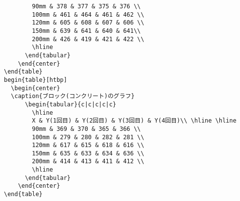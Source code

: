\documentclass{jsarticle}
\begin{document}
\begin{verbatim}
        90mm & 378 & 377 & 375 & 376 \\
        100mm & 461 & 464 & 461 & 462 \\
        120mm & 605 & 608 & 607 & 606 \\
        150mm & 639 & 641 & 640 & 641\\
        200mm & 426 & 419 & 421 & 422 \\
        \hline
      \end{tabular}
    \end{center}
\end{table}
begin{table}[htbp]
  \begin{center}
  \caption{ブロック(コンクリート)のグラフ}
      \begin{tabular}{c|c|c|c|c}
        \hline
        X & Y(1回目) & Y(2回目) & Y(3回目) & Y(4回目)\\ \hline \hline
        90mm & 369 & 370 & 365 & 366 \\
        100mm & 279 & 280 & 282 & 281 \\
        120mm & 617 & 615 & 618 & 616 \\
        150mm & 635 & 633 & 634 & 636 \\
        200mm & 414 & 413 & 411 & 412 \\
        \hline
      \end{tabular}
    \end{center}
\end{table}


\end{verbatim}
\end{document}
